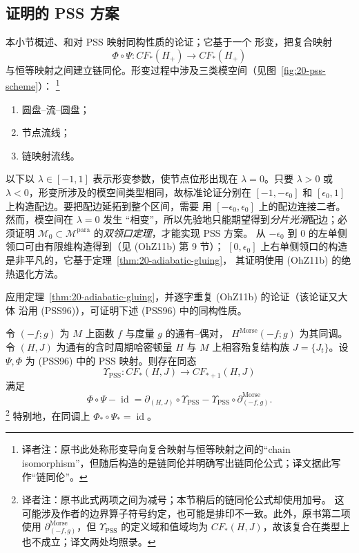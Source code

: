 \subsection{证明的 PSS 方案}

本小节概述\personPiunikhin{}、\personSalamon{}和\personSchwarz{}对 PSS 映射同构性质的论证；它基于一个
形变，把复合映射
\[
 \Phi\circ\Psi:CF_*(H_+)\longrightarrow CF_*(H_+)
\]
与恒等映射之间建立链同伦。形变过程中涉及三类模空间（见图~\ref{fig:20-pss-scheme}）：
\footnote{译者注：原书此处称形变导向复合映射与恒等映射之间的“chain
isomorphism”，但随后构造的是链同伦并明确写出链同伦公式；译文据此写作“链同伦”。}
\begin{samepage}
\begin{enumerate}[label=(\arabic*)]
\item 圆盘--流--圆盘；
\item 节点\personFloer{}流线；
\item 链映射\personFloer{}流线。
\end{enumerate}
\end{samepage}

以下以 $\lambda\in[-1,1]$ 表示形变参数，使节点位形出现在 $\lambda=0$。只要
$\lambda>0$ 或 $\lambda<0$，形变所涉及的模空间类型相同，故标准论证分别在
$[-1,-\epsilon_0]$ 和 $[\epsilon_0,1]$ 上构造配边。要把配边延拓到整个区间，需要
用 $[-\epsilon_0,\epsilon_0]$ 上的配边连接二者。然而，模空间在 $\lambda=0$ 发生
“相变”，所以先验地只能期望得到\emph{分片光滑}配边；必须证明
$\mathcal M_0\subset\mathcal M^{\mathrm{para}}$ 的\emph{双领口定理}，才能实现 PSS 方案。
从 $-\epsilon_0$ 到 $0$ 的左单侧领口可由有限维构造得到（见 (OhZ11b) 第 9 节）；
$[0,\epsilon_0]$ 上右单侧领口的构造是非平凡的，它基于定理~\ref{thm:20-adiabatic-gluing}，
其证明使用 (OhZ11b) 的绝热退化方法。

应用定理~\ref{thm:20-adiabatic-gluing}，并逐字重复 (OhZ11b) 的论证（该论证又大体
沿用 (PSS96)），可证明下述 (PSS96) 中的同构性质。

\begin{theorem}
\label{thm:20-pss-one-sided-inverse}
令 $(-f;g)$ 为 $M$ 上\personMorse{}函数 $f$ 与度量 $g$ 的通有\personMorse{}--\personSmale{}偶对，
$H^{\mathrm{Morse}}(-f;g)$ 为其\personMorse{}同调。令 $(H,J)$ 为通有的含时周期哈密顿量
$H$ 与 $M$ 上相容殆复结构族 $J=\{J_t\}$。设 $\Psi,\Phi$ 为 (PSS96) 中的 PSS
映射。则存在同态
\[
 \Upsilon_{\mathrm{PSS}}:CF_*(H,J)\longrightarrow CF_{*+1}(H,J)
\]
满足
\begin{equation}
 \Phi\circ\Psi-\operatorname{id}
 =\partial_{(H,J)}\circ\Upsilon_{\mathrm{PSS}}
 -\Upsilon_{\mathrm{PSS}}\circ\partial^{\mathrm{Morse}}_{(-f,g)}.
 \label{eq:20-pss-chain-homotopy}
\end{equation}
\footnote{译者注：原书此式两项之间为减号；本节稍后的链同伦公式却使用加号。
这可能涉及作者的边界算子符号约定，也可能是排印不一致。此外，原书第二项使用
$\partial^{\mathrm{Morse}}_{(-f,g)}$，但 $\Upsilon_{\mathrm{PSS}}$ 的定义域和值域均为
$CF_*(H,J)$，故该复合在类型上也不成立；译文两处均照录。}
特别地，在同调上 $\Phi_*\circ\Psi_*=\operatorname{id}$。
\end{theorem}

